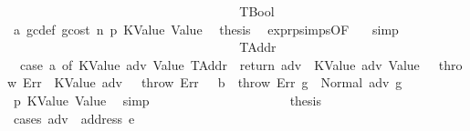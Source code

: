 \begin{isabellebody}
\ \ \ \ \ \ \ \ \ \ \ \ \ \ \ \ \isamarkupfalse%
\isanewline
\ \ \ \ \ \ \ \ \ \ \ \ \ \ \ \ \ \ \isamarkupfalse%
\ TBool\isanewline
\ \ \ \ \ \ \ \ \ \ \ \ \ \ \ \ \ \ \isamarkupfalse%
\ a{}\ gc{\isacharunderscore}{\kern0pt}def\ gcost\ n\ p{}\ KValue\ Value\ \isamarkupfalse%
\ {\isacharquery}{\kern0pt}thesis\ \isamarkupfalse%
\ expr{\isachardot}{\kern0pt}psimps{\isacharparenleft}{\kern0pt}{}{}{\isacharparenright}{\kern0pt}{\isacharbrackleft}{\kern0pt}OF\ {}{}{\isacharparenleft}{\kern0pt}{}{\isacharparenright}{\kern0pt}{\isacharbrackright}{\kern0pt}\ \isamarkupfalse%
\ simp\isanewline
\ \ \ \ \ \ \ \ \ \ \ \ \ \ \ \ \isamarkupfalse%
\isanewline
\ \ \ \ \ \ \ \ \ \ \ \ \ \ \ \ \ \ \isamarkupfalse%
\ TAddr\isanewline
\ \ \ \ \ \ \ \ \ \ \ \ \ \ \ \ \ \ \isamarkupfalse%
\ \isamarkupfalse%
\ {}{\isacharcolon}{\kern0pt}\ {\isachardoublequoteopen}{\isacharparenleft}{\kern0pt}case\ a{}\ of\ {\isacharparenleft}{\kern0pt}KValue\ adv{\isacharcomma}{\kern0pt}\ Value\ TAddr{\isacharparenright}{\kern0pt}\ {\isasymRightarrow}\ return\ adv\ {\isacharbar}{\kern0pt}\ {\isacharparenleft}{\kern0pt}KValue\ adv{\isacharcomma}{\kern0pt}\ Value\ {\isacharunderscore}{\kern0pt}{\isacharparenright}{\kern0pt}\ {\isasymRightarrow}\ throw\ Err\ {\isacharbar}{\kern0pt}\ {\isacharparenleft}{\kern0pt}KValue\ adv{\isacharcomma}{\kern0pt}\ {\isacharunderscore}{\kern0pt}{\isacharparenright}{\kern0pt}\ {\isasymRightarrow}\ throw\ Err\ {\isacharbar}{\kern0pt}\ {\isacharparenleft}{\kern0pt}{\isacharunderscore}{\kern0pt}{\isacharcomma}{\kern0pt}\ b{\isacharparenright}{\kern0pt}\ {\isasymRightarrow}\ throw\ Err{\isacharparenright}{\kern0pt}\ g{\isacharprime}{\kern0pt}\ {\isacharequal}{\kern0pt}\ Normal\ {\isacharparenleft}{\kern0pt}adv{\isacharcomma}{\kern0pt}\ g{\isacharprime}{\kern0pt}{\isacharparenright}{\kern0pt}{\isachardoublequoteclose}\ \isamarkupfalse%
\ p{}\ KValue\ Value\ \isamarkupfalse%
\ simp\isanewline
\ \ \ \ \ \ \ \ \ \ \ \ \ \ \ \ \ \ \isamarkupfalse%
\ \isamarkupfalse%
\ {\isacharquery}{\kern0pt}thesis\isanewline
\ \ \ \ \ \ \ \ \ \ \ \ \ \ \ \ \ \ \isamarkupfalse%
\ {\isacharparenleft}{\kern0pt}cases\ {\isachardoublequoteopen}adv\ {\isacharequal}{\kern0pt}\ address\ e{\isachardoublequoteclose}{\isacharparenright}{\kern0pt}\isanewline

\end{isabellebody}
